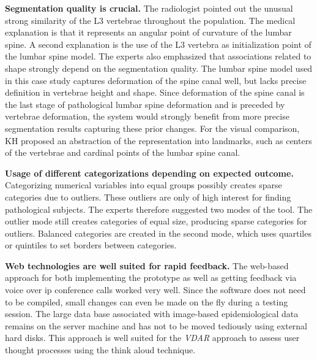 \documentclass[journal]{style/vgtc} 			          %
\newcommand{\rem}[1]{\textcolor{red}{\sout{#1}}}
\begin{document}
\textbf{Segmentation quality is crucial.}
The radiologist pointed out the unusual strong similarity of the L3 vertebrae throughout the population.
%
The medical explanation is that it represents an angular point of curvature of the lumbar spine.
%
A second explanation is the use of the L3 vertebra as initialization point of the lumbar spine model.
%
The experts also emphasized that associations related to shape strongly depend on the segmentation quality.
%
The lumbar spine model used in this case study captures deformation of the spine canal well, but lacks precise definition in vertebrae height and shape.
%
Since deformation of the spine canal is the last stage of pathological lumbar spine deformation and is preceded by vertebrae deformation, the system would strongly benefit from more precise segmentation results capturing these prior changes.
%
For the visual comparison, KH proposed an abstraction of the representation into landmarks, such as centers of the vertebrae and cardinal points of the lumbar spine canal.

\textbf{Usage of different categorizations depending on expected outcome.}
Categorizing numerical variables into equal groups possibly creates sparse categories due to outliers.%
%
These outliers are only of high interest for finding pathological subjects. %
%
The experts therefore suggested two modes of the tool.
%
The outlier mode still creates categories of equal size, producing sparse categories for outliers.
%
Balanced categories are created in the second mode, which uses quartiles or quintiles to set borders between categories.
%

\textbf{Web technologies are well suited for rapid feedback.}
The web-based approach for both implementing the prototype as well as getting feedback via voice over ip conference calls worked very well.
%
Since the software does not need to be compiled, small changes can even be made on the fly during a testing session.
%
The large data base associated with image-based epidemiological data remains on the server machine and has not to be moved tediously using external hard disks.
%
This approach is well suited for the \emph{VDAR} approach to assess user thought processes using the think aloud technique.
\end{document}
